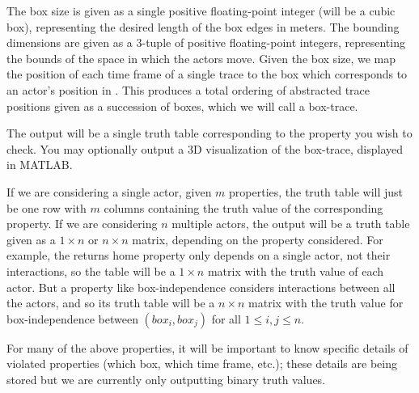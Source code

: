 The box size is given as a single positive floating-point integer (will be a cubic box), representing the desired length of the box edges in meters.
The bounding dimensions are given as a 3-tuple of positive floating-point integers, representing the bounds of the space in which the actors move.
Given the box size, we map the position of each time frame of a single trace to the box which corresponds to an actor's position in \rthree.
 This produces a total ordering of abstracted trace positions given as a succession of boxes, which we will call a box-trace.
 
 
 
 The output will be a single truth table corresponding to the property you wish to check.
 You may optionally output a 3D visualization of the box-trace, displayed in MATLAB.
 
 If we are considering a single actor, given $m$ properties, the truth table will just be one row with $m$ columns containing the truth value of the corresponding property.
 If we are considering $n$ multiple actors, the output will be a truth table given as a $1 \times n$ or $n \times n$ matrix, depending on the property considered.
 For example, the returns home property only depends on a single actor, not their interactions, so the table will be a $1 \times n$ matrix with the truth value of each actor.
 But a property like box-independence considers interactions between all the actors, and so its truth table will be a $n \times n$ matrix with the truth value for box-independence between $(box_i,box_j)$ for all $1 \leq i,j \leq n$.
 
  For many of the above properties, it will be important to know specific details of violated properties (which box, which time frame, etc.); these details are being stored but we are currently only outputting binary truth values.